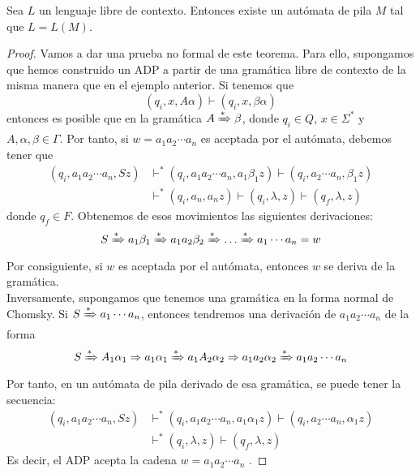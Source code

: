 \begin{teorema}\label{teo:llc-1}Sea $L$ un lenguaje libre de contexto. Entonces existe un autómata de pila $M$ tal que 
$L=L(M)$.
\end{teorema}
\begin{proof}
Vamos a dar una prueba no formal de este teorema. Para ello, supongamos que hemos construido un ADP a partir de una
gramática libre de contexto de la misma manera que en el ejemplo anterior. Si tenemos que
\begin{equation}
    (q_i,x,A\alpha)\vdash(q_i,x,\beta\alpha)
\end{equation}
entonces es posible que en la gramática $A\xRightarrow{*}\beta$, donde $q_i\in Q$, $x\in\Sigma^*$ y 
$A,\alpha,\beta\in\Gamma$. Por tanto, si $w=a_1a_2\cdots a_n$ es aceptada por el autómata, debemos tener que
\begin{align}
    (q_i,a_1a_2\cdots a_n,Sz)&\vdash^*(q_i,a_1a_2\cdots a_n,a_1\beta_1z)\vdash(q_i,a_2\cdots a_n,\beta_1z) \\
    &\vdash^*(q_i,a_n,a_nz)\vdash(q_i,\lambda,z)\vdash(q_f,\lambda,z)
\end{align}
donde $q_f\in F$. Obtenemos de esos movimientos las siguientes derivaciones:
\begin{equation}
    S\xRightarrow{*}a_1\beta_1\xRightarrow{*}a_1a_2\beta_2\xRightarrow{*}\dots\xRightarrow{*}a_1\cdots a_n=w
\end{equation}
Por consiguiente, si $w$ es aceptada por el autómata, entonces $w$ se deriva de la gramática. \\
Inversamente, supongamos que tenemos una gramática en la forma normal de Chomsky. Si $S\xRightarrow{*}a_1\cdots a_n$,
entonces tendremos una derivación de $a_1a_2\cdots a_n$ de la forma
\begin{equation}
    S\xRightarrow{*}A_1\alpha_1\Rightarrow a_1\alpha_1\xRightarrow{*}a_1A_2\alpha_2\Rightarrow a_1a_2\alpha_2
    \xRightarrow{*}a_1a_2\cdots a_n
\end{equation}
Por tanto, en un autómata de pila derivado de esa gramática, se puede tener la secuencia:
\begin{align}
    (q_i,a_1a_2\cdots a_n,Sz)&\vdash^*(q_i,a_1a_2\cdots a_n,a_1\alpha_1z)\vdash(q_i,a_2\cdots a_n,\alpha_1z) \\
    &\vdash^*(q_i,\lambda,z)\vdash(q_f,\lambda,z)
\end{align}
Es decir, el ADP acepta la cadena $w=a_1a_2\cdots a_n$ \cite{kelley_2001}.
\end{proof}

